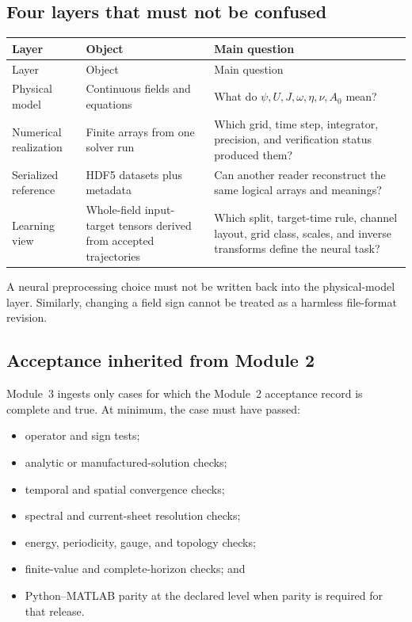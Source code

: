 \documentclass[11pt]{article}
\begin{document}
\subsection{Four layers that must not be confused}

\begin{longtable}{p{}p{}p{}}
\toprule
Layer & Object & Main question \\
\midrule
\endfirsthead
\toprule
Layer & Object & Main question \\
\midrule
\endhead
Physical model & Continuous fields and equations & What do $\psi,U,J,\omega,\eta,\nu,A_0$ mean? \\
Numerical realization & Finite arrays from one solver run & Which grid, time step, integrator, precision, and verification status produced them? \\
Serialized reference & HDF5 datasets plus metadata & Can another reader reconstruct the same logical arrays and meanings? \\
Learning view & Whole-field input-target tensors derived from accepted trajectories & Which split, target-time rule, channel layout, grid class, scales, and inverse transforms define the neural task? \\
\bottomrule
\end{longtable}

A neural preprocessing choice must not be written back into the physical-model layer. Similarly, changing a field sign cannot be treated as a harmless file-format revision.

\subsection{Acceptance inherited from Module 2}

Module~3 ingests only cases for which the Module~2 acceptance record is complete and true. At minimum, the case must have passed:
\begin{itemize}
  \item operator and sign tests;
  \item analytic or manufactured-solution checks;
  \item temporal and spatial convergence checks;
  \item spectral and current-sheet resolution checks;
  \item energy, periodicity, gauge, and topology checks;
  \item finite-value and complete-horizon checks; and
  \item Python--MATLAB parity at the declared level when parity is required for that release.
\end{itemize}
\end{document}
